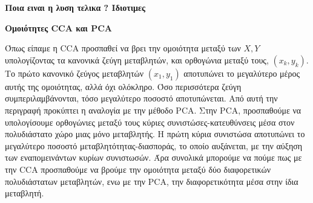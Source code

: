 \documentclass[11pt,a4paper,english,greek,twoside]{../Thesis}
\begin{document}
\textbf{Ποια ειναι η λυση τελικα ? Ιδιοτιμες}

\textbf{Ομοιότητες CCA και PCA} 
\par Όπως είπαμε η CCA προσπαθεί να βρει την ομοιότητα μεταξύ των $Χ,Y$ υπολογίζοντας τα κανονικά ζεύγη μεταβλητών, και ορθογώνια μεταξύ τους, $(x_k,y_k)$. Το πρώτο κανονικό ζεύγος μεταβλητών $(x_1, y_1)$ αποτυπώνει το μεγαλύτερο μέρος αυτής της ομοιότητας, αλλά όχι ολόκληρο. Όσο περισσότερα ζεύγη συμπεριλαμβάνονται, τόσο μεγαλύτερο ποσοστό αποτυπώνεται. Από αυτή την περιγραφή προκύπτει η αναλογία με την μέθοδο PCA. Στην PCA, προσπαθούμε να υπολογίσουμε ορθογώνιες μεταξύ τους κύριες συνιστώσες-κατευθύνσεις μέσα στον πολυδιάστατο χώρο μιας μόνο μεταβλητής. Η πρώτη κύρια συνιστώσα αποτυπώνει το μεγαλύτερο ποσοστό μεταβλητότητας-διασποράς, το οποίο αυξάνεται, με την αύξηση των εναπομεινάντων κυρίων συνιστωσών. Άρα συνολικά μπορούμε να πούμε πως με την CCA προσπαθούμε να βρούμε την ομοιότητα μεταξύ δύο διαφορετικών πολυδιάστατων μεταβλητών, ενω με την PCA, την διαφορετικότητα μέσα στην ίδια μεταβλητή.
\end{document}

